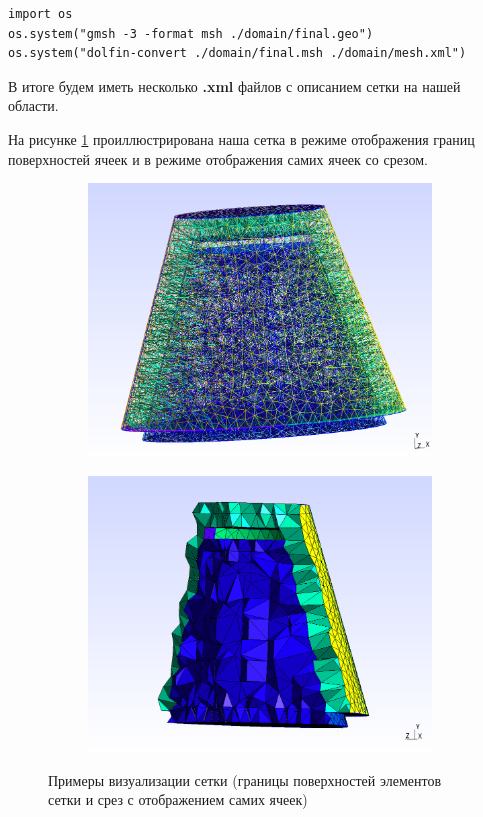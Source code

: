 \documentclass[a4paper, 14pt]{extreport}
\begin{document}
\begin{lstlisting}
import os
os.system("gmsh -3 -format msh ./domain/final.geo")
os.system("dolfin-convert ./domain/final.msh ./domain/mesh.xml")
\end{lstlisting}

В итоге будем иметь несколько \textbf{.xml} файлов с описанием
сетки на нашей области.

На рисунке \ref{fig: mesh_display}
проиллюстрирована наша сетка в режиме отображения границ
поверхностей ячеек и в режиме отображения самих ячеек со срезом.

\begin{figure}[H]
	\begin{subfigure}[h]{0.5\textwidth}
		\includegraphics[scale=0.23]{pictures/mesh_surfaces_edges_full.png}
	\end{subfigure}
	\begin{subfigure}[h]{0.5\textwidth}
		\includegraphics[scale=0.23]{pictures/mesh_volumes_slice.png}
	\end{subfigure}
	\caption{Примеры визуализации сетки (границы поверхностей элементов сетки и срез с отображением самих ячеек)}
	\label{fig: mesh_display}
\end{figure}
\end{document}
